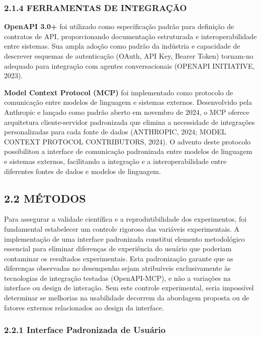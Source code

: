 \documentclass[
]{article}
\begin{document}
\subsubsection{2.1.4 FERRAMENTAS DE
INTEGRAÇÃO}\label{ferramentas-de-integrauxe7uxe3o}

\textbf{OpenAPI 3.0+} foi utilizado como especificação padrão para
definição de contratos de API, proporcionando documentação estruturada e
interoperabilidade entre sistemas. Sua ampla adoção como padrão da
indústria e capacidade de descrever esquemas de autenticação (OAuth, API
Key, Bearer Token) tornam-no adequado para integração com agentes
conversacionais (OPENAPI INITIATIVE, 2023).

\textbf{Model Context Protocol (MCP)} foi implementado como protocolo de
comunicação entre modelos de linguagem e sistemas externos. Desenvolvido
pela Anthropic e lançado como padrão aberto em novembro de 2024, o MCP
oferece arquitetura cliente-servidor padronizada que elimina a
necessidade de integrações personalizadas para cada fonte de dados
(ANTHROPIC, 2024; MODEL CONTEXT PROTOCOL CONTRIBUTORS, 2024). O advento
deste protocolo possibilitou a interface de comunicação padronizada
entre modelos de linguagem e sistemas externos, facilitando a integração
e a interoperabilidade entre diferentes fontes de dados e modelos de
linguagem.

\subsection{2.2 MÉTODOS}\label{muxe9todos}

Para assegurar a validade científica e a reprodutibilidade dos
experimentos, foi fundamental estabelecer um controle rigoroso das
variáveis experimentais. A implementação de uma interface padronizada
constitui elemento metodológico essencial para eliminar diferenças de
experiência do usuário que poderiam contaminar os resultados
experimentais. Esta padronização garante que as diferenças observadas no
desempenho sejam atribuíveis exclusivamente às tecnologias de integração
testadas (OpenAPI-MCP), e não a variações na interface ou design de
interação. Sem este controle experimental, seria impossível determinar
se melhorias na usabilidade decorrem da abordagem proposta ou de fatores
externos relacionados ao design da interface.

\subsubsection{2.2.1 Interface Padronizada de
Usuário}\label{interface-padronizada-de-usuuxe1rio}
\end{document}
